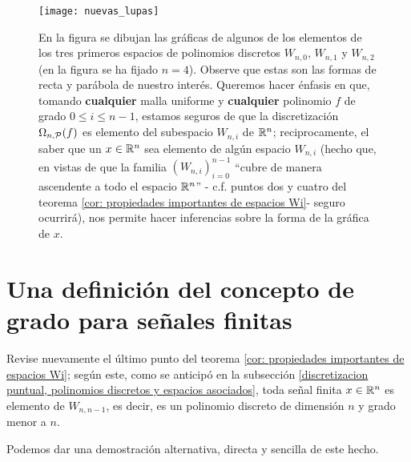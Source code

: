 \begin{figure}[H]
\centering\captionsetup{format = hang}
	\begin{measuredfigure}
		\texttt{[image: nuevas\_lupas]} 
		\caption{
	En la figura	
	se dibujan las gráficas de algunos de los elementos
	de los tres primeros espacios de polinomios discretos
	$W_{n,0}$, $W_{n,1}$ y $W_{n,2}$
	(en la figura se ha fijado $n=4$).
    Observe que estas son
	las formas de recta y parábola de
	nuestro interés. 
	Queremos hacer énfasis en que, tomando
	\textbf{cualquier} malla uniforme y \textbf{cualquier} 
	polinomio $f$
	de grado $0 \leq i \leq n-1$, estamos seguros de que
	la discretización $\Omega_{n, \mathcal{P}}(f)$ es elemento
	del subespacio $W_{n,i}$ de $\mathbb{R}^{n}$; reciprocamente, el 
	saber que un $x \in \mathbb{R}^{n}$ sea elemento 
	de algún espacio $W_{n,i}$ (hecho
	que, en vistas de que la familia $(W_{n,i})_{i=0}^{n-1}$
	``cubre de manera ascendente a todo el espacio $\mathbb{R}^{n}$''
	- c.f. puntos dos y cuatro del teorema 
	\ref{cor: propiedades importantes de espacios Wi}- seguro 
	ocurrirá), nos permite hacer inferencias sobre la forma 
	de la gráfica de $x$.}
 	\end{measuredfigure}
 \end{figure}





\section{Una definición del concepto de grado para señales finitas}
\label{definicion del concepto de grado para seniales finitas}

Revise nuevamente el último punto del teorema
\ref{cor: propiedades importantes de espacios Wi}; según este,
como se anticipó en la subsección 
\ref{discretizacion puntual, polinomios discretos y espacios asociados},
toda señal finita $x \in \mathbb{R}^{n}$
es elemento de $W_{n,n-1}$,
es decir, es un polinomio discreto
de dimensión $n$ y grado menor a $n$.

Podemos dar una demostración
alternativa,
directa y sencilla de este hecho.

